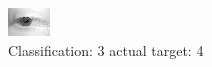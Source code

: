 \begin{figure}[h!]
\begin{center}
\includegraphics[width=0.60\columnwidth]{figures/ID2694_class_3_target_4.png}
\end{center}
\caption{ Classification: 3 actual target: 4}
\label{fig:ID2694_class_3_target_4}
\end{figure}
